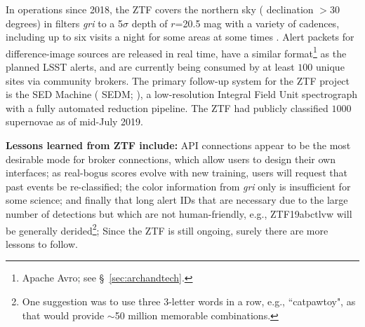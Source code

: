 In operations since 2018, the  {ZTF} covers the northern sky ( {declination} $>$30 degrees) in filters {\it gri} to a 5$\sigma$ depth of $r$=20.5 mag with a variety of cadences, including up to six visits a night for some areas at some times \citep{2019PASP..131f8003B,2019PASP..131g8001G}.
Alert packets for difference-image sources are released in real time, have a similar format\footnote{Apache Avro; see \S~\ref{sec:archandtech}.} as the planned  {LSST} alerts, and are currently being consumed by at least $100$ unique sites via community brokers.
The primary follow-up system for the  {ZTF} project is the  {SED} Machine ( {SEDM}; \citealt{2018PASP..130c5003B}), a low-resolution Integral Field Unit spectrograph with a fully automated reduction  {pipeline}.
The  {ZTF} had publicly classified $1000$ supernovae as of mid-July 2019. 

{\bf Lessons learned from  {ZTF} include:}
API connections appear to be the most desirable mode for broker connections, which allow users to design their own interfaces;
as real-bogus scores evolve with new training, users will request that past events be re-classified;
the color information from {\it gri} only is insufficient for some science;
and finally that long alert IDs that are necessary due to the large number of detections but which are not human-friendly, e.g., ZTF19abctlvw will be generally derided\footnote{One suggestion was to use three 3-letter words in a row, e.g., ``catpawtoy", as that would provide $\sim$50 million memorable combinations.};
Since the  {ZTF} is still ongoing, surely there are more lessons to follow.


